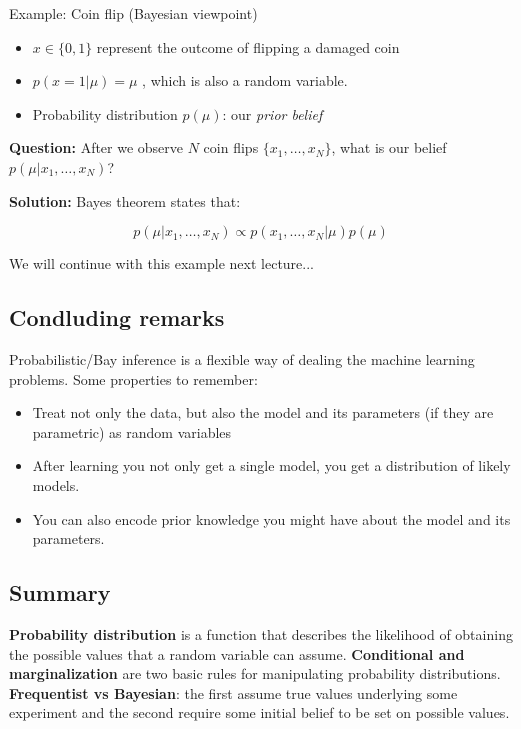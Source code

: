 \begin{example}{Example: Coin flip (Bayesian viewpoint)}
\begin{itemize}
    \item $x \in \{ 0,1\}$ represent the outcome of flipping a damaged coin 
    \item $p(x=1 | \mu) = \mu$ , which is also a random variable. 
    \item Probability distribution $p(\mu)$: our \emph{prior belief} 
\end{itemize}

\vspace{2em}

\textbf{Question:} After we observe $N$ coin flips $\{ x_1, \dots, x_N\}$, what is our belief $p(\mu | x_1, \dots, x_N)$?

\textbf{Solution:} Bayes theorem states that:

\begin{equation}
    p(\mu | x_1, \dots, x_N) \propto p(x_1, \dots, x_N | \mu)p(\mu) 
\end{equation}

We will continue with this example next lecture... 

\end{example}


\subsection{Condluding remarks}
Probabilistic/Bay inference is a flexible way of dealing the machine learning problems. Some properties to remember:

\begin{itemize}
    \item Treat not only the data, but also the model and its parameters (if they are parametric) as random variables
    \item After learning you not only get a single model, you get a distribution of likely models.
    \item You can also encode prior knowledge you might have about the model  and its parameters.
\end{itemize}

\subsection{Summary}
\textbf{Probability distribution} is a function that describes the likelihood of obtaining the possible values that a random variable can assume. \textbf{Conditional and marginalization} are two basic rules for manipulating probability distributions. \textbf{Frequentist vs Bayesian}: the first assume true values underlying some experiment and the second require some initial belief to be set on possible values.

